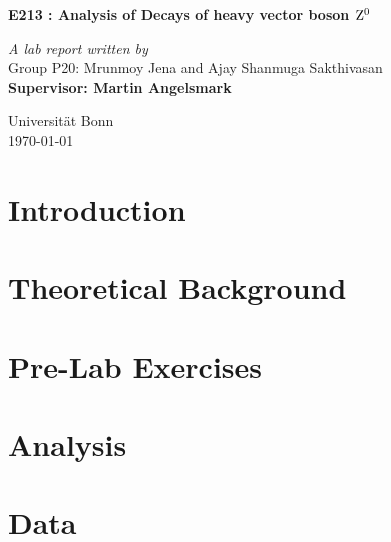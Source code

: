 \documentclass[a4paper]{report}
\begin{document}
\begin{onehalfspace}
\vspace*{0.5in}
\begin{center}
\begin{LARGE}
\textbf{E213 : Analysis of Decays of heavy vector boson $\rm Z^{0}$}\\ 
\end{LARGE}
\bigskip
\bigskip
\textit{A lab report written by}\\
Group P20: Mrunmoy Jena and Ajay Shanmuga Sakthivasan\\
\medskip
\textbf{Supervisor: Martin Angelsmark}\\
\vspace*{5in}
\begin{flushright}
Universit\"{a}t	Bonn\\
\today
\end{flushright}
\end{center}
\tableofcontents
\chapter*{Introduction}

\chapter{Theoretical Background}


\chapter{Pre-Lab Exercises}


\chapter{Analysis}


\end{onehalfspace}
\printbibliography[title = References]

\appendix
\chapter{Data}

\end{document}
